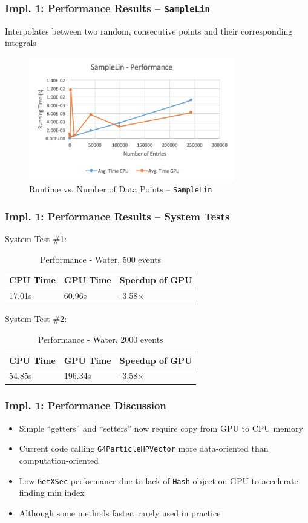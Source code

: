 \documentclass{beamer}
\begin{document}
\begin{frame}
\frametitle{Impl. 1: Performance Results -- \texttt{SampleLin}}
Interpolates between two random, consecutive points and their corresponding integrals
\begin{figure}
\centering
\includegraphics[width=0.8\textwidth]{images/samplelin_line.png}
\caption{Runtime vs. Number of Data Points -- \texttt{SampleLin}}
\end{figure}
\end{frame}

\begin{frame}
\frametitle{Impl. 1: Performance Results -- System Tests}
System Test \#1:
\begin{table}
	\begin{tabular}{lll}
	\toprule
	\bf CPU Time&\bf  GPU Time&\bf Speedup of GPU\\\midrule
	17.01s&60.96s&-3.58$\times$\\\bottomrule
	\end{tabular}
	\caption{Performance - Water, 500 events}
\end{table}
System Test \#2:
\begin{table}
	\begin{tabular}{lll}
	\toprule
	\bf CPU Time&\bf  GPU Time&\bf Speedup of GPU\\\midrule
	54.85s&196.34s&-3.58$\times$\\\bottomrule
	\end{tabular}
	\caption{Performance - Water, 2000 events}
\end{table}
\end{frame}

\begin{frame}
\frametitle{Impl. 1: Performance Discussion}
\begin{itemize}
\item Simple ``getters'' and ``setters'' now require copy from GPU to CPU memory
\item Current code calling \texttt{G4ParticleHPVector} more data-oriented than computation-oriented
\item Low \texttt{GetXSec} performance due to lack of \texttt{Hash} object on GPU to accelerate finding min index
\item Although some methods faster, rarely used in practice
\end{itemize}
\end{frame}
\end{document}
